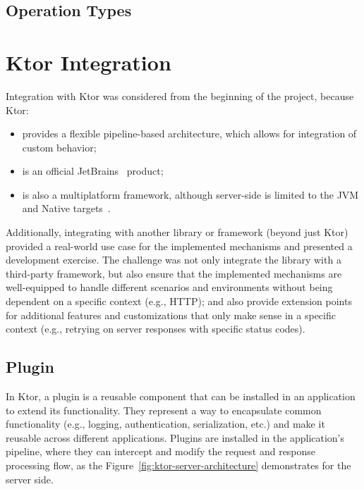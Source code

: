 \subsection{Operation Types}\label{subsec:operation-types}


\section{Ktor Integration}\label{sec:ktor-integration}

Integration with Ktor was considered from the beginning of the project, because Ktor:
\begin{itemize}
    \item provides a flexible pipeline-based architecture, which allows for integration of custom behavior;
    \item is an official JetBrains~\cite{jetbrains} product;
    \item is also a multiplatform framework, although server-side is limited to the JVM and Native targets~\cite{ktor-server-platforms}.
\end{itemize}

Additionally, integrating with another library or framework (beyond just Ktor) provided a real-world use case for the implemented mechanisms and presented a development exercise.
The challenge was not only integrate the library with a third-party framework, but also ensure that the implemented mechanisms are well-equipped to handle different scenarios and environments without being dependent on a specific context (e.g., HTTP); and also provide extension points for additional features and customizations that only make sense in a specific context (e.g., retrying on server responses with specific status codes).

\subsection{Plugin}\label{subsec:plugin}

In Ktor, a plugin is a reusable component that can be installed in an application to extend its functionality.
They represent a way to encapsulate common functionality (e.g., logging, authentication, serialization, etc.) and make it reusable across different applications.
Plugins are installed in the application's pipeline, where they can intercept and modify the request and response processing flow, as the Figure~\ref{fig:ktor-server-architecture} demonstrates for the server side.

